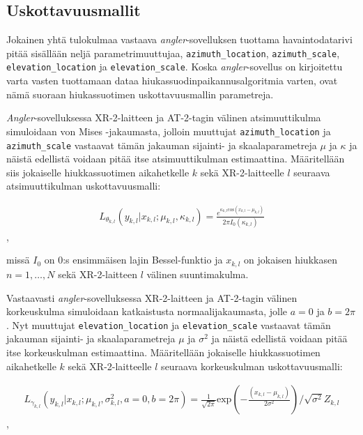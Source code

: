 \documentclass[
  12pt,
  a4paper, twoside]{book}
\begin{document}
\hypertarget{uskottavuusmallit}{%
\subsection{Uskottavuusmallit}\label{uskottavuusmallit}}

Jokainen yhtä tulokulmaa vastaava \emph{angler}-sovelluksen tuottama havaintodatarivi pitää sisällään neljä parametrimuuttujaa, \texttt{azimuth\_location}, \texttt{azimuth\_scale}, \texttt{elevation\_location} ja \texttt{elevation\_scale}. Koska \emph{angler}-sovellus on kirjoitettu varta vasten tuottamaan dataa hiukassuodinpaikannusalgoritmia varten, ovat nämä suoraan hiukassuotimen uskottavuusmallin parametreja.

\emph{Angler}-sovelluksessa XR-2-laitteen ja AT-2-tagin välinen atsimuuttikulma simuloidaan von Mises -jakaumasta, jolloin muuttujat \texttt{azimuth\_location} ja \texttt{azimuth\_scale} vastaavat tämän jakauman sijainti- ja skaalaparametreja \(\mu\) ja \(\kappa\) ja näistä edellistä voidaan pitää itse atsimuuttikulman estimaattina. Määritellään siis jokaiselle hiukkassuotimen aikahetkelle \(k\) sekä XR-2-laitteelle \(l\) seuraava atsimuuttikulman uskottavuusmalli:

\begin{align}\label{atsimuutti-uskottavuusmalli}
L_{\theta_{k,l}}(y_{k,l}|x_{k,l}; \mu_{k,l}, \kappa_{k,l})=\frac{e^{\kappa_{k,l} \text{cos}(x_{k,l}-\mu_{k,l})}}{2 \pi I_0(\kappa_{k,l})}
\end{align},

missä \(I_0\) on 0:s ensimmäisen lajin Bessel-funktio ja \(x_{k,l}\) on jokaisen hiukkasen \(n=1,\ldots,N\) sekä XR-2-laitteen \(l\) välinen suuntimakulma.

Vastaavasti \emph{angler}-sovelluksessa XR-2-laitteen ja AT-2-tagin välinen korkeuskulma simuloidaan katkaistusta normaalijakaumasta, jolle \(a=0\) ja \(b=2 \pi\). Nyt muuttujat \texttt{elevation\_location} ja \texttt{elevation\_scale} vastaavat tämän jakauman sijainti- ja skaalaparametreja \(\mu\) ja \(\sigma^2\) ja näistä edellistä voidaan pitää itse korkeuskulman estimaattina. Määritellään jokaiselle hiukkassuotimen aikahetkelle \(k\) sekä XR-2-laitteelle \(l\) seuraava korkeuskulman uskottavuusmalli:

\begin{align}\label{korkeus-uskottavuusmalli}
L_{\gamma_{k,l}}(y_{k,l}|x_{k,l}; \mu_{k,l}, \sigma^2_{k,l}, a=0, b=2 \pi)=\frac{1}{\sqrt{2 \pi}} \text{exp}(-\frac{(x_{k, l}-\mu_{k, l})}{2 \sigma^2}) / \sqrt{\sigma^2}Z_{k,l}
\end{align},
\end{document}
